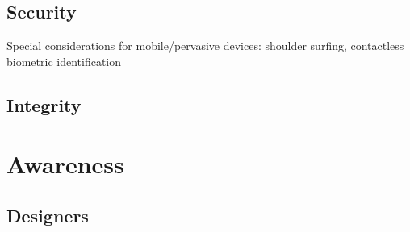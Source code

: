 \documentclass[oribibl,11pt]{llncs}
\begin{document}
\subsection{Security}	\label{sub:security}

Special considerations for mobile/pervasive devices: shoulder surfing, contactless biometric identification

\cite{Schaub:2013:EDS:2501604.2501615}


\subsection{Integrity}	\label{sub:integrity}

\section{Awareness}			\label{sec:awareness}

\subsection{Designers}	\label{sub:designers}
\end{document}
